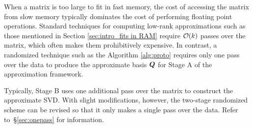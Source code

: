 \documentclass[12pt]{article}
\begin{document}
When a matrix is too large to fit in fast memory, the cost of
accessing the matrix from slow memory typically dominates the cost
of performing floating point operations. Standard techniques for
computing low-rank approximations such as those mentioned in Section
\ref{sec:intro_fits in RAM} require $\mathcal{O}(k)$ passes over the matrix,
which often makes them prohibitively expensive. In contrast, a
randomized technique such as the Algorithm \ref{alg:proto} requires only one pass over the data to produce the approximate basis
$\bm{Q}$ for Stage A of the approximation framework.



Typically, Stage B uses one additional pass over the matrix to
construct the approximate SVD.
With slight modifications, however, the two-stage randomized scheme
can be revised so that it only makes a single pass over the
data.  Refer to~\S\ref{sec:onepass} for information.
\end{document}
